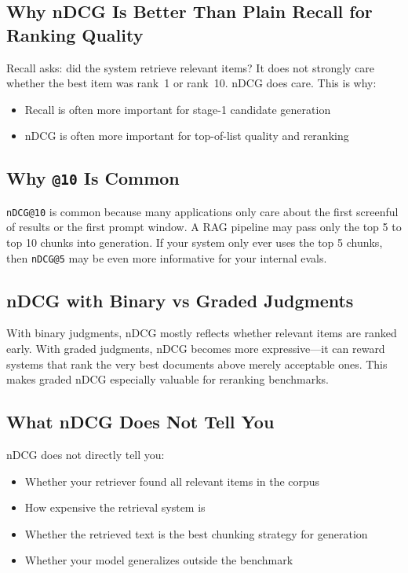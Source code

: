 \subsection{Why nDCG Is Better Than Plain Recall for Ranking Quality}

Recall asks: did the system retrieve relevant items? It does not strongly care whether the
best item was rank~1 or rank~10. nDCG does care. This is why:

\begin{itemize}
    \item Recall is often more important for stage-1 candidate generation
    \item nDCG is often more important for top-of-list quality and reranking
\end{itemize}

\subsection{Why \texttt{@10} Is Common}

\texttt{nDCG@10} is common because many applications only care about the first screenful of
results or the first prompt window. A RAG pipeline may pass only the top 5 to top 10 chunks
into generation. If your system only ever uses the top 5 chunks, then \texttt{nDCG@5} may be
even more informative for your internal evals.

\subsection{nDCG with Binary vs Graded Judgments}

With binary judgments, nDCG mostly reflects whether relevant items are ranked early.
With graded judgments, nDCG becomes more expressive---it can reward systems that rank the
very best documents above merely acceptable ones. This makes graded nDCG especially valuable
for reranking benchmarks.

\subsection{What nDCG Does Not Tell You}

nDCG does not directly tell you:

\begin{itemize}
    \item Whether your retriever found all relevant items in the corpus
    \item How expensive the retrieval system is
    \item Whether the retrieved text is the best chunking strategy for generation
    \item Whether your model generalizes outside the benchmark
\end{itemize}

